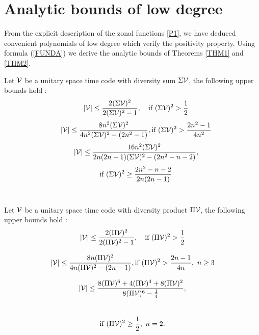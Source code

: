 \documentclass[10pt]{article}
\begin{document}
\section{Analytic bounds of low degree}

 From the explicit description of the zonal functions \eqref{P1},
 we have deduced convenient 
polynomials of low degree which verify the positivity property. Using 
formula (\ref{FUNDA})  we derive the analytic bounds of Theorems \ref{THM1} and \ref{THM2}.\\

  \noindent\begin{theorem}\label{THM1}
  Let $\mathcal V$ be a unitary space time code with diversity sum $\Sigma \mathcal V$, the following upper bounds hold : 
  \noindent \begin{equation}
     \noindent  \quad |\Code|\le  \frac{2(\Sigma \Nu)^2}{2(\Sigma \Nu)^2-1},
    \quad \text{if }(\Sigma \Nu)^2 >\frac{1}{2}
    \end{equation}
    \begin{equation}\label{DEG2SUM}
   \quad |\mathcal V| \le \frac{8n^2(\Sigma \mathcal V)^2}{4n^2(\Sigma \mathcal V)^2-(2n^2-1)}, 
     \text{if }(\Sigma \mathcal V)^2 > \frac{2n^2-1}{4n^2}
    \end{equation}
    \begin{equation}
   \quad |\mathcal V| \le \frac{16 n^2 (\Sigma \mathcal V)^2} {2n(2n-1)(\Sigma \mathcal V)^2-(2n^2-n-2)},\end{equation}
   $$\\ \quad \text{if } (\Sigma \mathcal V)^2 \ge \frac{2n^2-n-2}{2n(2n-1)}$$\\
 \end{theorem}

\noindent \begin{theorem}\label{THM2}
Let $\mathcal V$ be a unitary space time code with diversity product $\Pi \mathcal V$, the following upper bounds hold :
 \begin{equation}
   |\mathcal V| \le \frac{2(\Pi \mathcal V)^2}{2(\Pi \mathcal V)^2-1}, \quad \text{if }(\Pi \mathcal V)^2 > \frac{1}{{2}}
 \end{equation}   
 
\begin{equation}\label{DEG2PROD}
   |\mathcal V| \le \frac{8n(\Pi \mathcal V)^2 }{4n(\Pi \mathcal V)^2-(2n-1) },  \text{if }(\Pi \mathcal V)^2 > \frac{2n-1}{4n}, \ n \ge 3
 \end{equation}   
 
\begin{equation}
   |\mathcal V| \le \frac{8(\Pi \mathcal V)^6+4(\Pi \mathcal V)^4+8(\Pi \mathcal V)^2}{8(\Pi \mathcal V)^6-\frac{1}{4}},
 \end{equation}\\
$$\text{if }(\Pi \Nu)^2 \ge \frac{1}{2}, \ n=2.$$\\
 \end{theorem}
\end{document}
